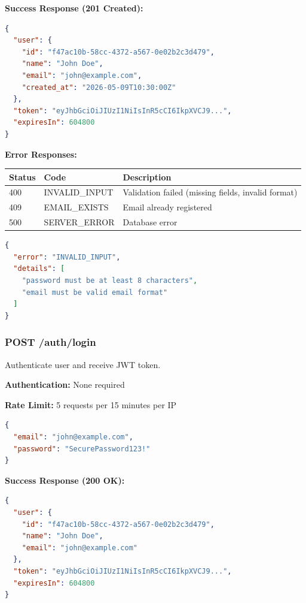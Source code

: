 \documentclass[12pt,a4paper,oneside]{article}
\begin{document}
\textbf{Success Response (201 Created):}

\begin{lstlisting}[language=JSON, caption=Response 201]
{
  "user": {
    "id": "f47ac10b-58cc-4372-a567-0e02b2c3d479",
    "name": "John Doe",
    "email": "john@example.com",
    "created_at": "2026-05-09T10:30:00Z"
  },
  "token": "eyJhbGciOiJIUzI1NiIsInR5cCI6IkpXVCJ9...",
  "expiresIn": 604800
}
\end{lstlisting}

\textbf{Error Responses:}

\begin{table}[H]
\centering
\small
\begin{tabular}{|p{1.8cm}|p{2.5cm}|p{8.7cm}|}
\hline
\textbf{Status} & \textbf{Code} & \textbf{Description} \\
\hline
400 & INVALID\_INPUT & Validation failed (missing fields, invalid format) \\
\hline
409 & EMAIL\_EXISTS & Email already registered \\
\hline
500 & SERVER\_ERROR & Database error \\
\hline
\end{tabular}
\end{table}

\begin{lstlisting}[language=JSON, caption=Error Response 400]
{
  "error": "INVALID_INPUT",
  "details": [
    "password must be at least 8 characters",
    "email must be valid email format"
  ]
}
\end{lstlisting}

\subsubsection{POST /auth/login}

Authenticate user and receive JWT token.

\textbf{Authentication:} None required

\textbf{Rate Limit:} 5 requests per 15 minutes per IP

\begin{lstlisting}[language=JSON, caption=Request Body]
{
  "email": "john@example.com",
  "password": "SecurePassword123!"
}
\end{lstlisting}

\textbf{Success Response (200 OK):}

\begin{lstlisting}[language=JSON, caption=Response 200]
{
  "user": {
    "id": "f47ac10b-58cc-4372-a567-0e02b2c3d479",
    "name": "John Doe",
    "email": "john@example.com"
  },
  "token": "eyJhbGciOiJIUzI1NiIsInR5cCI6IkpXVCJ9...",
  "expiresIn": 604800
}
\end{lstlisting}
\end{document}
